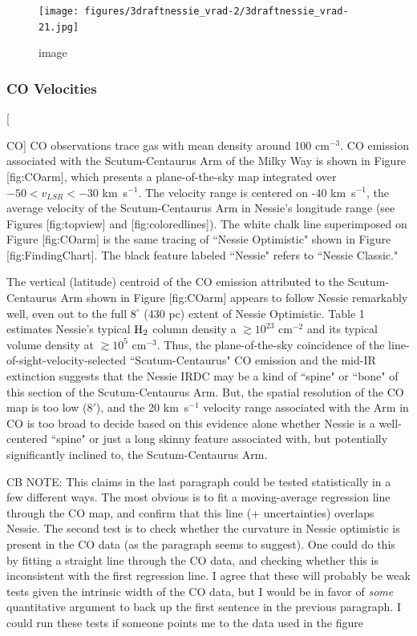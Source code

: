 \documentclass[]{article}
\begin{document}
\begin{figure}[htbp]
\centering
\texttt{[image: figures/3draftnessie\_vrad-2/3draftnessie\_vrad-21.jpg]}
\caption{image}
\end{figure}

\subsubsection{CO Velocities}

{[}

CO{]} CO observations trace gas with mean density around 100 cm$^{-3}$.
CO emission associated with the Scutum-Centaurus Arm of the Milky Way is
shown in Figure {[}fig:COarm{]}, which presents a plane-of-the-sky map
integrated over $-50 <v_{LSR}< -30$ km~s$^{-1}$. The velocity range is
centered on -40 km~s$^{-1}$, the average velocity of the
Scutum-Centaurus Arm in Nessie's longitude range (see Figures
{[}fig:topview{]} and {[}fig:coloredlines{]}). The white chalk line
superimposed on Figure {[}fig:COarm{]} is the same tracing of ``Nessie
Optimistic" shown in Figure {[}fig:FindingChart{]}. The black feature
labeled ``Nessie" refers to ``Nessie Classic."

The vertical (latitude) centroid of the CO emission attributed to the
Scutum-Centaurus Arm \citep{Dame2011} shown in Figure {[}fig:COarm{]}
appears to follow Nessie remarkably well, even out to the full $8^\circ$
(430 pc) extent of Nessie Optimistic. Table 1 estimates Nessie's typical
${\rm H_2}$ column density a $\gtrsim 10^{23}$ cm$^{-2}$ and its typical
volume density at $\gtrsim 10^5$ cm$^{-3}$. Thus, the plane-of-the-sky
coincidence of the line-of-sight-velocity-selected ``Scutum-Centaurus"
CO emission and the mid-IR extinction suggests that the Nessie IRDC may
be a kind of ``spine" or ``bone" of this section of the Scutum-Centaurus
Arm. But, the spatial resolution of the CO map is too low ($8'$), and
the 20 km~s$^{-1}$ velocity range associated with the Arm in CO is too
broad to decide based on this evidence alone whether Nessie is a
well-centered ``spine" or just a long skinny feature associated with,
but potentially significantly inclined to, the Scutum-Centaurus Arm.

CB NOTE: This claims in the last paragraph could be tested statistically
in a few different ways. The most obvious is to fit a moving-average
regression line through the CO map, and confirm that this line (+
uncertainties) overlaps Nessie. The second test is to check whether the
curvature in Nessie optimistic is present in the CO data (as the
paragraph seems to suggest). One could do this by fitting a straight
line through the CO data, and checking whether this is inconsistent with
the first regression line. I agree that these will probably be weak
tests given the intrinsic width of the CO data, but I would be in favor
of \emph{some} quantitative argument to back up the first sentence in
the previous paragraph. I could run these tests if someone points me to
the data used in the figure
\end{document}
